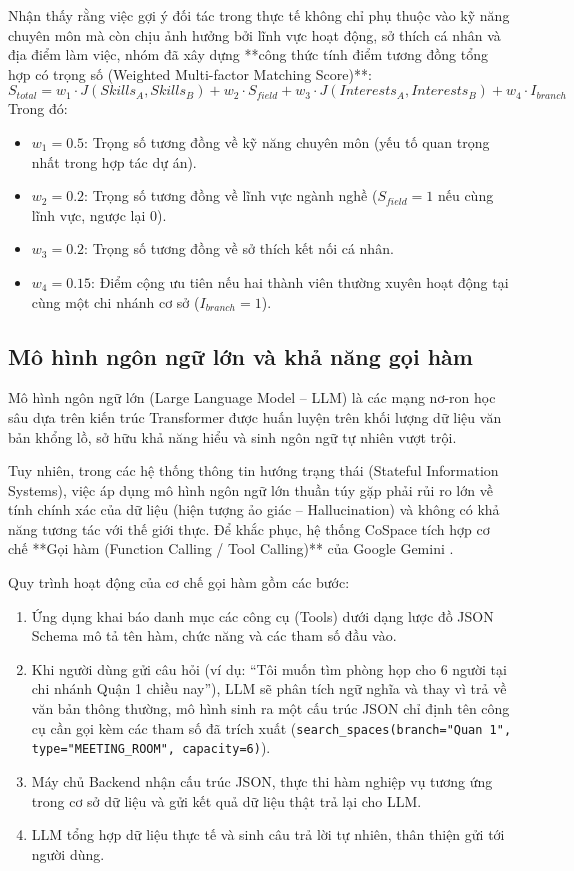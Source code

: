 Nhận thấy rằng việc gợi ý đối tác trong thực tế không chỉ phụ thuộc vào kỹ năng chuyên môn mà còn chịu ảnh hưởng bởi lĩnh vực hoạt động, sở thích cá nhân và địa điểm làm việc, nhóm đã xây dựng **công thức tính điểm tương đồng tổng hợp có trọng số (Weighted Multi-factor Matching Score)**:
\begin{equation}
    S_{total} = w_1 \cdot J(Skills_A, Skills_B) + w_2 \cdot S_{field} + w_3 \cdot J(Interests_A, Interests_B) + w_4 \cdot I_{branch}
    \label{eq:weighted_jaccard}
\end{equation}
Trong đó:
\begin{itemize}
    \item $w_1 = 0.5$: Trọng số tương đồng về kỹ năng chuyên môn (yếu tố quan trọng nhất trong hợp tác dự án).
    \item $w_2 = 0.2$: Trọng số tương đồng về lĩnh vực ngành nghề ($S_{field} = 1$ nếu cùng lĩnh vực, ngược lại $0$).
    \item $w_3 = 0.2$: Trọng số tương đồng về sở thích kết nối cá nhân.
    \item $w_4 = 0.15$: Điểm cộng ưu tiên nếu hai thành viên thường xuyên hoạt động tại cùng một chi nhánh cơ sở ($I_{branch} = 1$).
\end{itemize}

\subsection{Mô hình ngôn ngữ lớn và khả năng gọi hàm}
Mô hình ngôn ngữ lớn (Large Language Model -- LLM) là các mạng nơ-ron học sâu dựa trên kiến trúc Transformer được huấn luyện trên khối lượng dữ liệu văn bản khổng lồ, sở hữu khả năng hiểu và sinh ngôn ngữ tự nhiên vượt trội. 

Tuy nhiên, trong các hệ thống thông tin hướng trạng thái (Stateful Information Systems), việc áp dụng mô hình ngôn ngữ lớn thuần túy gặp phải rủi ro lớn về tính chính xác của dữ liệu (hiện tượng ảo giác -- Hallucination) và không có khả năng tương tác với thế giới thực. Để khắc phục, hệ thống CoSpace tích hợp cơ chế **Gọi hàm (Function Calling / Tool Calling)** của Google Gemini \cite{gemini_function_calling}.

Quy trình hoạt động của cơ chế gọi hàm gồm các bước:
\begin{enumerate}
    \item Ứng dụng khai báo danh mục các công cụ (Tools) dưới dạng lược đồ JSON Schema mô tả tên hàm, chức năng và các tham số đầu vào.
    \item Khi người dùng gửi câu hỏi (ví dụ: ``Tôi muốn tìm phòng họp cho 6 người tại chi nhánh Quận 1 chiều nay''), LLM sẽ phân tích ngữ nghĩa và thay vì trả về văn bản thông thường, mô hình sinh ra một cấu trúc JSON chỉ định tên công cụ cần gọi kèm các tham số đã trích xuất (\texttt{search\_spaces(branch="Quan 1", type="MEETING\_ROOM", capacity=6)}).
    \item Máy chủ Backend nhận cấu trúc JSON, thực thi hàm nghiệp vụ tương ứng trong cơ sở dữ liệu và gửi kết quả dữ liệu thật trả lại cho LLM.
    \item LLM tổng hợp dữ liệu thực tế và sinh câu trả lời tự nhiên, thân thiện gửi tới người dùng.
\end{enumerate}

